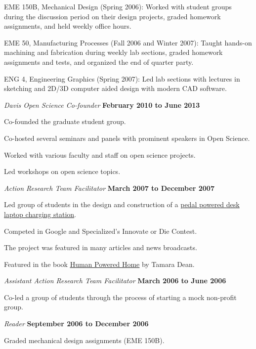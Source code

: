 \documentclass[10pt]{article}
\newenvironment{outerlist}[1][\enskip\textbullet]%
        {\begin{itemize}[#1]}{\end{itemize}%
         \vspace{-.6\baselineskip}}
\newenvironment{innerlist}[1][\enskip\textbullet]%
        {\begin{compactitem}[#1]}{\end{compactitem}}
\begin{document}
\begin{outerlist}
  \begin{innerlist}
    \item EME 150B, Mechanical Design (Spring 2006): Worked with student groups
        during the discussion period on their design projects, graded homework
        assignments, and held weekly office hours.
    \item EME 50, Manufacturing Processes (Fall 2006 and Winter 2007): Taught
        hands-on machining and fabrication during weekly lab sections, graded
        homework assignments and tests, and organized the end of quarter party.
    \item ENG 4, Engineering Graphics (Spring 2007): Led lab sections with
        lectures in sketching and 2D/3D computer aided design with modern CAD
        software.
  \end{innerlist}
  \item[] \textit{Davis Open Science Co-founder}%
    \hfill \textbf{February 2010 to June 2013}
  \begin{innerlist}
    \item Co-founded the graduate student group.
    \item Co-hosted several seminars and panels with prominent speakers in Open
      Science.
    \item Worked with various faculty and staff on open science projects.
    \item Led workshops on open science topics.
  \end{innerlist}
  \item[] \textit{Action Research Team Facilitator}%
        \hfill \textbf{March 2007 to December 2007}
  \begin{innerlist}
    \item Led group of students in the design and construction of a
        \href{http://mae.ucdavis.edu/~biosport/jkm/ped_desk.htm}{pedal powered
        desk laptop charging station}.
    \item Competed in Google and Specialized's Innovate or Die Contest.
    \item The project was featured in many articles and news broadcasts.
    \item Featured in the book
        \href{http://www.thehumanpoweredhome.com/}{\underline{Human Powered
        Home}} by Tamara Dean.
  \end{innerlist}
  \item[] \textit{Assistant Action Research Team Facilitator}%
    \hfill \textbf{March 2006 to June 2006}
  \begin{innerlist}
    \item Co-led a group of students through the process of starting a mock
        non-profit group.
  \end{innerlist}
  \item[] \textit{Reader}%
    \hfill \textbf{September 2006 to December 2006}
  \begin{innerlist}
    \item Graded mechanical design assignments (EME 150B).
  \end{innerlist}
\end{outerlist}
\end{document}
